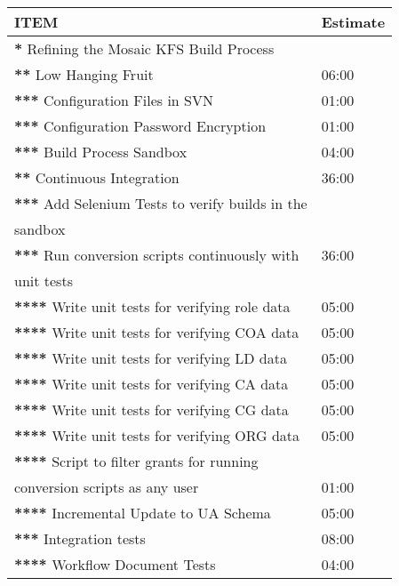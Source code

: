 \begin{tabular}{|l|l|}
 ITEM                                              &  Estimate  \\
\hline
 \textbf{*} Refining the Mosaic KFS Build Process           &            \\
\hline
 \textbf{**} Low Hanging Fruit                              &     06:00  \\
 \textbf{***} Configuration Files in SVN                    &     01:00  \\
 \textbf{***} Configuration Password Encryption             &     01:00  \\
 \textbf{***} Build Process Sandbox                         &     04:00  \\
\hline
 \textbf{**} Continuous Integration                         &     36:00  \\
 \textbf{***} Add Selenium Tests to verify builds in the    &            \\
 sandbox                                           &            \\
 \textbf{***} Run conversion scripts continuously with      &     36:00  \\
 unit tests                                        &            \\
 \textbf{****} Write unit tests for verifying role data     &     05:00  \\
 \textbf{****} Write unit tests for verifying COA data      &     05:00  \\
 \textbf{****} Write unit tests for verifying LD data       &     05:00  \\
 \textbf{****} Write unit tests for verifying CA data       &     05:00  \\
 \textbf{****} Write unit tests for verifying CG data       &     05:00  \\
 \textbf{****} Write unit tests for verifying ORG data      &     05:00  \\
 \textbf{****} Script to filter grants for running          &            \\
 conversion scripts as any user                    &     01:00  \\
 \textbf{****} Incremental Update to UA Schema              &     05:00  \\
 \textbf{***} Integration tests                             &     08:00  \\
 \textbf{****} Workflow Document Tests                      &     04:00  \\

\end{tabular}
